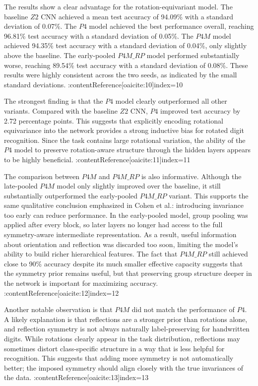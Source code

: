 \documentclass{article}
\begin{document}
The results show a clear advantage for the rotation-equivariant model. The baseline $Z2$ CNN achieved a mean test accuracy of 94.09\% with a standard deviation of 0.07\%. The $P4$ model achieved the best performance overall, reaching 96.81\% test accuracy with a standard deviation of 0.05\%. The $P4M$ model achieved 94.35\% test accuracy with a standard deviation of 0.04\%, only slightly above the baseline. The early-pooled $P4M\_RP$ model performed substantially worse, reaching 89.54\% test accuracy with a standard deviation of 0.08\%. These results were highly consistent across the two seeds, as indicated by the small standard deviations. :contentReference[oaicite:10]{index=10}

The strongest finding is that the $P4$ model clearly outperformed all other variants. Compared with the baseline $Z2$ CNN, $P4$ improved test accuracy by 2.72 percentage points. This suggests that explicitly encoding rotational equivariance into the network provides a strong inductive bias for rotated digit recognition. Since the task contains large rotational variation, the ability of the $P4$ model to preserve rotation-aware structure through the hidden layers appears to be highly beneficial. :contentReference[oaicite:11]{index=11}

The comparison between $P4M$ and $P4M\_RP$ is also informative. Although the late-pooled $P4M$ model only slightly improved over the baseline, it still substantially outperformed the early-pooled $P4M\_RP$ variant. This supports the same qualitative conclusion emphasized in Cohen et al.: introducing invariance too early can reduce performance. In the early-pooled model, group pooling was applied after every block, so later layers no longer had access to the full symmetry-aware intermediate representation. As a result, useful information about orientation and reflection was discarded too soon, limiting the model’s ability to build richer hierarchical features. The fact that $P4M\_RP$ still achieved close to 90\% accuracy despite its much smaller effective capacity suggests that the symmetry prior remains useful, but that preserving group structure deeper in the network is important for maximizing accuracy. :contentReference[oaicite:12]{index=12}

Another notable observation is that $P4M$ did not match the performance of $P4$. A likely explanation is that reflections are a stronger prior than rotations alone, and reflection symmetry is not always naturally label-preserving for handwritten digits. While rotations clearly appear in the task distribution, reflections may sometimes distort class-specific structure in a way that is less helpful for recognition. This suggests that adding more symmetry is not automatically better; the imposed symmetry should align closely with the true invariances of the data. :contentReference[oaicite:13]{index=13}
\end{document}
